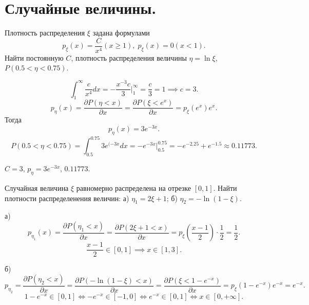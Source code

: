
\section{Случайные величины.}

\begin{task}{1}
Плотность распределения $\xi$ задана формулами 
\[
  p_\xi(x) = \frac{C}{x^4} (x \ge 1), \; p_\xi (x) = 0 (x < 1)
.\] 
Найти постоянную $C$, плотность распределения величины $\eta = \ln \xi$, $P(0.5 < \eta < 0.75)$.
\end{task}

\begin{solution}
\[
\int_{1}^\infty \frac{c}{x^4} dx = -\frac{x^{-3} c}{3} \bigg|_1^\infty = \frac{c}{3} = 1 \implies
c = 3
.\] 
\[
p_\eta(x) = \frac{\partial P(\eta < x)}{\partial x} = \frac{\partial P(\xi < e^x)}{\partial x} =
p_\xi(e^x) e^x
.\] Тогда \[
p_\eta(x) = 3e^{-3x}
.\] 
\[
  P\left(0.5 < \eta < 0.75\right) = \int_{0.5}^{0.75} 3e^{(-3x} dx = -e^{-3x}\bigg|_{0.5}^{0.75} =
  -e^{-2.25} + e^{-1.5} \approx 0.11773
.\] 
\end{solution}

\begin{result}
  $C = 3$, $p_\eta = 3e^{-3x}$, $0.11773$.
\end{result}

\medskip
\begin{task}{2}
  Случайная величина $\xi$ равномерно распределена на отрезке $\left[0, 1\right]$. Найти плотности
  распределенения величин: а) $\eta_1 = 2\xi + 1$; б) $\eta_2 = -\ln(1 - \xi)$.
\end{task}

\begin{subtask}{а)}
\[
  p_{\eta_1}(x) = \frac{\partial P(\eta_1 < x)}{\partial x} = \frac{\partial P(2\xi + 1 <
  x)}{\partial x} = p_\xi(\frac{x - 1}{2}) \cdot \frac{1}{2} = \frac{1}{2}
.\] 
\[
  \frac{x - 1}{2} \in [0,1] \implies x \in [1, 3]
.\] 
\end{subtask}

\begin{subtask}{б)}
\[
p_{\eta_2} = \frac{\partial P(\eta_2 < x)}{\partial x}  = \frac{\partial P(-\ln(1 - \xi) <
x)}{\partial x} =  \frac{\partial P(\xi < 1 - e^{-x})}{\partial x} = p_\xi(1 - e^{-x}) e^{-x} =
e^{-x}
.\] 
\[
  1 - e^{-x} \in [0,1] \Longleftrightarrow  -e^{-x} \in [-1, 0] \Longleftrightarrow e^{-x} \in [0,
  1] \Longleftrightarrow x \in [0, +\infty] 
.\] 
\end{subtask}

